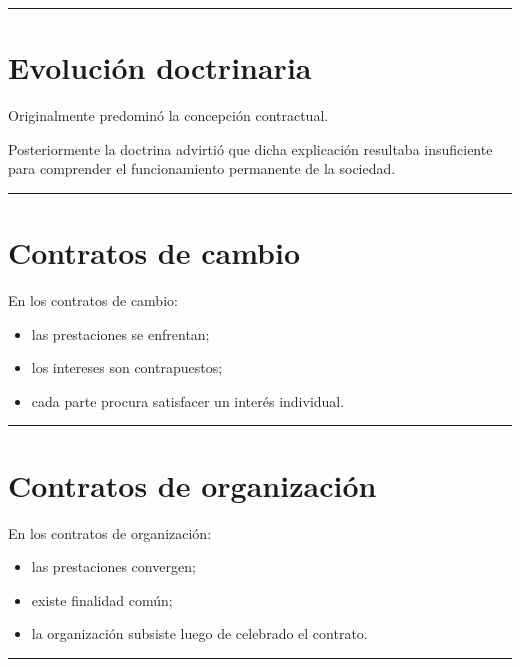 \documentclass[
  spanish,
  letterpaper,
  DIV=11,
  numbers=noendperiod]{scrartcl}
\providecommand{\tightlist}{%
  \setlength{\itemsep}{0pt}\setlength{\parskip}{0pt}}
\begin{document}
\begin{center}\rule{0.5\linewidth}{0.5pt}\end{center}

\section{Evolución doctrinaria}\label{evoluciuxf3n-doctrinaria}

Originalmente predominó la concepción contractual.

Posteriormente la doctrina advirtió que dicha explicación resultaba
insuficiente para comprender el funcionamiento permanente de la
sociedad.

\begin{center}\rule{0.5\linewidth}{0.5pt}\end{center}

\section{Contratos de cambio}\label{contratos-de-cambio}

En los contratos de cambio:

\begin{itemize}
\tightlist
\item
  las prestaciones se enfrentan;
\item
  los intereses son contrapuestos;
\item
  cada parte procura satisfacer un interés individual.
\end{itemize}

\begin{center}\rule{0.5\linewidth}{0.5pt}\end{center}

\section{Contratos de organización}\label{contratos-de-organizaciuxf3n}

En los contratos de organización:

\begin{itemize}
\tightlist
\item
  las prestaciones convergen;
\item
  existe finalidad común;
\item
  la organización subsiste luego de celebrado el contrato.
\end{itemize}

\begin{center}\rule{0.5\linewidth}{0.5pt}\end{center}
\end{document}
